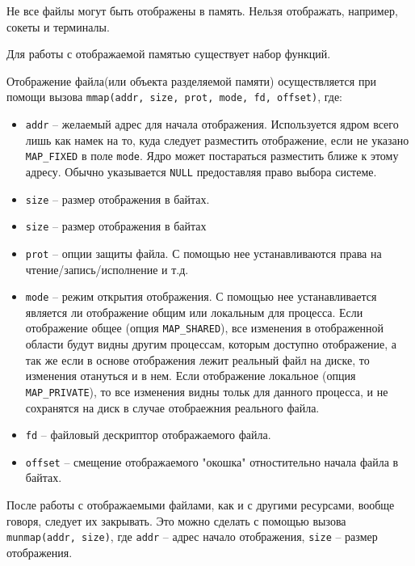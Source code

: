 \documentclass[12pt]{article}
\begin{document}
        Не все файлы могут быть отображены в память. Нельзя отображать, например, сокеты и терминалы.
    
    Для работы с отображаемой памятью существует набор функций.
    
        Отображение файла(или объекта разделяемой памяти) осуществляется при помощи вызова \verb|mmap(addr, size, prot, mode, fd, offset)|, где:
        \begin{itemize}
            \item \verb|addr| -- желаемый адрес для начала отображения. Используется ядром всего лишь как намек на то, куда следует разместить отображение, если не указано \verb|MAP_FIXED| в поле \verb|mode|. Ядро может постараться разместить ближе к этому адресу. Обычно указывается  \verb|NULL| предоставляя право выбора системе.
            \item \verb|size| -- размер отображения в байтах. 
            \item \verb|size| -- размер отображения в байтах
            \item \verb|prot| -- опции защиты файла. С помощью нее устанавливаются права на чтение/запись/исполнение и т.д.
            \item \verb|mode| -- режим открытия отображения. С помощью нее устанавливается является ли отображение общим или локальным для процесса. Если отображение общее (опция  \verb|MAP_SHARED|), все изменения в отображенной области будут видны другим процессам, которым доступно отображение, а так же если в основе отображения лежит реальный файл на диске, то изменения отануться и в нем.
            Если отображение локальное (опция  \verb|MAP_PRIVATE|), то все изменения видны тольк для данного процесса, и не сохранятся на диск в случае отобраежния реального файла.
            \item \verb|fd| -- файловый дескриптор отображаемого файла.
            \item  \verb|offset| -- смещение отображаемого "окошка" отностительно начала файла в байтах.
        \end{itemize}
        
         После работы с отображаемыми файлами, как и с другими ресурсами, вообще говоря, следует их закрывать. Это можно сделать с помощью вызова \verb|munmap(addr, size)|, где \verb|addr| -- адрес начало отображения, \verb|size| -- размер отображения.
\end{document}
